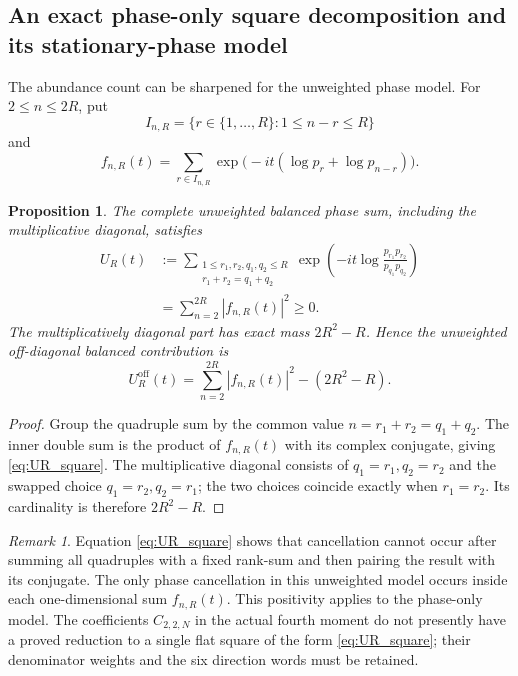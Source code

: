 \documentclass[11pt]{amsart}
\numberwithin{equation}{section}
\theoremstyle{plain}
\newtheorem{proposition}[theorem]{Proposition}
\theoremstyle{definition}
\theoremstyle{remark}
\newtheorem{remark}[theorem]{Remark}
\begin{document}
\subsection{An exact phase-only square decomposition and its stationary-phase model}
\label{subsec:phase_only_stationary}

The abundance count can be sharpened for the unweighted phase model.  For $2\le n\le 2R$, put
\begin{equation}
I_{n,R}=\{r\in\{1,\ldots,R\}:1\le n-r\le R\}
\label{eq:InR_definition}
\end{equation}
and
\begin{equation}
f_{n,R}(t)=\sum_{r\in I_{n,R}}
\exp\bigl(-it(\log p_r+\log p_{n-r})\bigr).
\label{eq:fnR_definition}
\end{equation}

\begin{proposition}
\label{prop:phase_only_square_decomposition}
The complete unweighted balanced phase sum, including the multiplicative diagonal, satisfies
\begin{align}
U_R(t)
&:=\sum_{\substack{1\le r_1,r_2,q_1,q_2\le R\\
r_1+r_2=q_1+q_2}}
\exp\left(-it\log\frac{p_{r_1}p_{r_2}}{p_{q_1}p_{q_2}}\right)
\label{eq:UR_quadruple}\\
&=\sum_{n=2}^{2R}|f_{n,R}(t)|^2\ge0.
\label{eq:UR_square}
\end{align}
The multiplicatively diagonal part has exact mass $2R^2-R$.  Hence the unweighted off-diagonal balanced contribution is
\begin{equation}
U_R^{\mathrm{off}}(t)=\sum_{n=2}^{2R}|f_{n,R}(t)|^2-(2R^2-R).
\label{eq:UR_offdiagonal}
\end{equation}
\end{proposition}

\begin{proof}
Group the quadruple sum by the common value $n=r_1+r_2=q_1+q_2$.  The inner double sum is the product of $f_{n,R}(t)$ with its complex conjugate, giving \eqref{eq:UR_square}.  The multiplicative diagonal consists of $q_1=r_1,q_2=r_2$ and the swapped choice $q_1=r_2,q_2=r_1$; the two choices coincide exactly when $r_1=r_2$.  Its cardinality is therefore $2R^2-R$.
\end{proof}

\begin{remark}
\label{rem:no_quadruple_cancellation}
Equation \eqref{eq:UR_square} shows that cancellation cannot occur after summing all quadruples with a fixed rank-sum and then pairing the result with its conjugate.  The only phase cancellation in this unweighted model occurs inside each one-dimensional sum $f_{n,R}(t)$.  This positivity applies to the phase-only model.  The coefficients $C_{2,2,N}$ in the actual fourth moment do not presently have a proved reduction to a single flat square of the form \eqref{eq:UR_square}; their denominator weights and the six direction words must be retained.
\end{remark}
\end{document}
